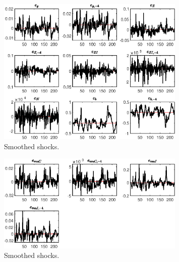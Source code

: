  
\begin{figure}[H]
\centering 
\includegraphics[width=0.80\textwidth]{RBC_sectoral/graphs/RBC_sectoral_SmoothedShocks1}
\caption{Smoothed shocks.}\label{Fig:SmoothedShocks:1}
\end{figure}

\begin{figure}[H]
\centering 
\includegraphics[width=0.80\textwidth]{RBC_sectoral/graphs/RBC_sectoral_SmoothedShocks2}
\caption{Smoothed shocks.}\label{Fig:SmoothedShocks:2}
\end{figure}


